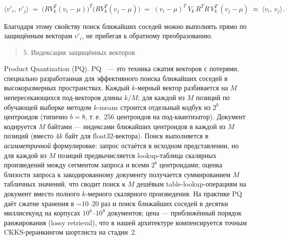 \documentclass[a4paper, 12pt, oneside, openany]{article}
\begin{document}
\[
\langle v'_{i},\, v'_{j} \rangle \;=\; \bigl( R V_{k}^{T} (v_{i} - \mu) \bigr)^{T} \bigl( R V_{k}^{T} (v_{j} - \mu) \bigr) \;=\; (v_{i} - \mu)^{T}\, V_{k}\, R^{T} R\, V_{k}^{T}\, (v_{j} - \mu) \;\approx\; \langle v_{i},\, v_{j} \rangle.
\]

Благодаря этому свойству поиск ближайших соседей можно выполнять прямо по защищённым векторам $v'_i$, не прибегая к обратному преобразованию.

\begin{quote}
	5. Индексация защищённых векторов.
\end{quote}

Product Quantization (PQ). PQ~\cite{ref58} --- это техника сжатия векторов с потерями, специально разработанная для эффективного поиска ближайших соседей в высокоразмерных пространствах. Каждый $k$-мерный вектор разбивается на $M$ непересекающихся под-векторов длины $k/M$; для каждой из $M$ позиций по обучающей выборке методом $k$-means строится отдельный кодбук из $2^{b}$ центроидов (типично $b = 8$, т.\,е.\ 256 центроидов на под-квантизатор). Документ кодируется $M$ байтами --- индексами ближайших центроидов в каждой из $M$ позиций (вместо $4k$ байт для $\mathrm{float32}$-вектора). Поиск выполняется в \emph{асимметричной} формулировке: запрос остаётся в исходном представлении, но для каждой из $M$ позиций предвычисляется lookup-таблица скалярных произведений между сегментом запроса и всеми $2^{b}$ центроидами; оценка близости запроса к закодированному документу получается суммированием $M$ табличных значений, что сводит поиск к $M$ дешёвым table-lookup-операциям на документ вместо полного $k$-мерного скалярного произведения. На практике PQ даёт сжатие хранения в $\sim 10$--$20$ раз и поиск ближайших соседей в десятки миллисекунд на корпусах $10^6$--$10^9$ документов; цена --- приближённый порядок ранжирования (lossy retrieval), что в нашей архитектуре компенсируется точным CKKS-реранкингом шортлиста на стадии~2.
\end{document}
